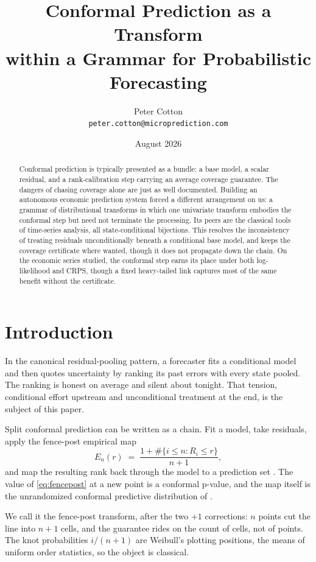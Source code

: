 \documentclass[11pt]{article}
\title{Conformal Prediction as a Transform\\ within a Grammar for Probabilistic Forecasting}
\author{Peter Cotton\\\texttt{peter.cotton@microprediction.com}}
\date{August 2026}
\theoremstyle{remark}
\begin{document}
\maketitle

\begin{abstract}
Conformal prediction is typically presented as a bundle: a base model, a scalar
residual, and a rank-calibration step carrying an average coverage guarantee. The
dangers of chasing coverage alone are just as well documented. Building an autonomous
economic prediction system forced a different arrangement on us: a grammar of
distributional transforms in which one univariate transform embodies the conformal
step but need not terminate the processing. Its peers are the classical tools of
time-series analysis, all state-conditional bijections. This resolves the
inconsistency of treating residuals unconditionally beneath a conditional base model,
and keeps the coverage certificate where wanted, though it does not propagate down
the chain. On the economic series studied, the conformal step earns its
place under both log-likelihood and CRPS, though a fixed heavy-tailed link captures
most of the same benefit without the certificate.
\end{abstract}

\section{Introduction}\label{sec:intro}

In the canonical residual-pooling pattern, a forecaster fits a conditional model and
then quotes uncertainty by ranking its past errors with every state pooled. The ranking is honest on average and silent about
tonight. That tension, conditional effort upstream and unconditional treatment at the
end, is the subject of this paper.

Split conformal prediction can be written as a chain. Fit a model, take residuals, apply
the fence-post empirical map
\begin{equation}\label{eq:fencepost}
E_n(r) \;=\; \frac{1 + \#\{i \le n : R_i \le r\}}{n+1},
\end{equation}
and map the resulting rank back through the model to a prediction set
\citep{vovk2005algorithmic,lei2018distribution}. The value of \eqref{eq:fencepost} at a
new point is a conformal p-value, and the map itself is the unrandomized conformal
predictive distribution of \citet{vovk2019nonparametric}.

We call it the fence-post
transform, after the two $+1$ corrections: $n$ points cut the line into $n+1$ cells, and
the guarantee rides on the count of cells, not of points. The knot probabilities
$i/(n+1)$ are Weibull's plotting positions, the means of uniform order statistics, so the
object is classical.
\end{document}
